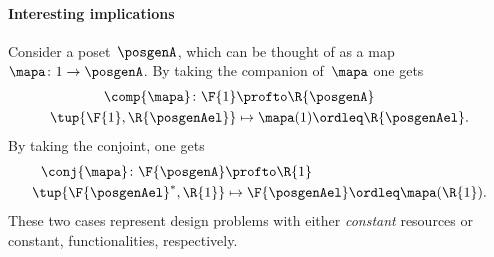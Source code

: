 \paragraph{Interesting implications}
Consider a poset~$\posgenA$, which can be thought of as a map~$\mapa \colon 1\to \posgenA$.
By taking the companion of~$\mapa$ one gets
\begin{equation}
    \begin{aligned}
        \comp{\mapa}\colon \F{1}&\profto \R{\posgenA}\\
        \tup{\F{1},\R{\posgenAel}}&\mapsto \mapa(1)\ordleq \R{\posgenAel}.
    \end{aligned}
\end{equation}
By taking the conjoint, one gets
\begin{equation}
    \begin{aligned}
        \conj{\mapa}\colon \F{\posgenA}&\profto \R{1}\\
        \tup{\F{\posgenAel}^*,\R{1}}&\mapsto \F{\posgenAel}\ordleq \mapa(\R{1}).
    \end{aligned}
\end{equation}
These two cases represent design problems with either \emph{constant} resources or constant, functionalities, respectively.